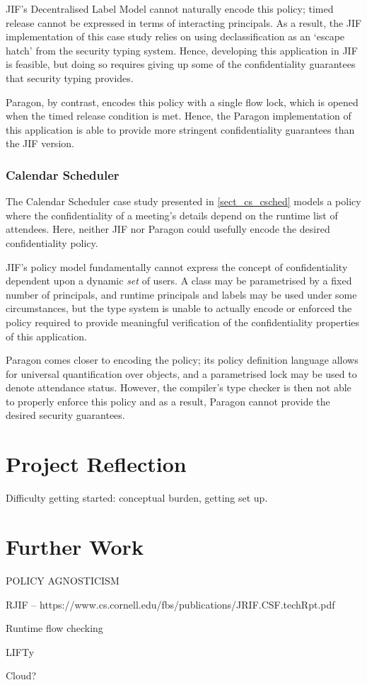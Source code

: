 JIF's Decentralised Label Model cannot naturally encode this policy; timed release cannot be expressed in terms of interacting principals. As a result, the JIF implementation of this case study relies on using declassification as an `escape hatch' from the security typing system. Hence, developing this application in JIF is feasible, but doing so requires giving up some of the confidentiality guarantees that security typing provides.

Paragon, by contrast, encodes this policy with a single flow lock, which is opened when the timed release condition is met. Hence, the Paragon implementation of this application is able to provide more stringent confidentiality guarantees than the JIF version.

\subsubsection{Calendar Scheduler}

The Calendar Scheduler case study presented in \ref{sect_cs_csched} models a policy where the confidentiality of a meeting's details depend on the runtime list of attendees. Here, neither JIF nor Paragon could usefully encode the desired confidentiality policy.

JIF's policy model fundamentally cannot express the concept of confidentiality dependent upon a dynamic \textit{set} of users. A class may be parametrised by a fixed number of principals, and runtime principals and labels may be used under some circumstances, but the type system is unable to actually encode or enforced the policy required to provide meaningful verification of the confidentiality properties of this application.

Paragon comes closer to encoding the policy; its policy definition language allows for universal quantification over objects, and a parametrised lock may be used to denote attendance status. However, the compiler's type checker is then not able to properly enforce this policy and as a result, Paragon cannot provide the desired security guarantees.

\section{Project Reflection}

Difficulty getting started: conceptual burden, getting set up.

\section{Further Work}

POLICY AGNOSTICISM

RJIF -- https://www.cs.cornell.edu/fbs/publications/JRIF.CSF.techRpt.pdf

Runtime flow checking

LIFTy \cite{polikarpova2016lifty}

Cloud?